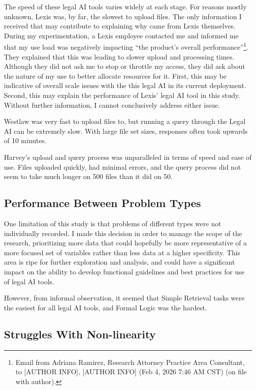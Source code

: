 \documentclass[
]{article}
\begin{document}
The speed of these legal AI tools varies widely at each stage. For reasons mostly unknown, Lexis was, by far, the slowest to upload files. The only information I received that may contribute to explaining why came from Lexis themselves. During my experimentation, a Lexis employee contacted me and informed me that my use load was negatively impacting ``the product's overall performance''\footnote{Email from Adriana Ramirez, Research Attorney Practice Area Consultant, to {[}AUTHOR INFO{]}, {[}AUTHOR INFO{]} (Feb 4, 2026 7:46 AM CST) (on file with author).}. They explained that this was leading to slower upload and processing times. Although they did not ask me to stop or throttle my access, they did ask about the nature of my use to better allocate resources for it. First, this may be indicative of overall scale issues with the this legal AI in its current deployment. Second, this may explain the performance of Lexis' legal AI tool in this study. Without further information, I cannot conclusively address either issue.

Westlaw was very fast to upload files to, but running a query through the Legal AI can be extremely slow. With large file set sizes, responses often took upwards of 10 minutes.

Harvey's upload and query process was unparalleled in terms of speed and ease of use. Files uploaded quickly, had minimal errors, and the query process did not seem to take much longer on 500 files than it did on 50.

\subsection{Performance Between Problem Types}\label{performance-between-problem-types}

One limitation of this study is that problems of different types were not individually recorded. I made this decision in order to manage the scope of the research, prioritizing more data that could hopefully be more representative of a more focused set of variables rather than less data at a higher specificity. This area is ripe for further exploration and analysis, and could have a significant impact on the ability to develop functional guidelines and best practices for use of legal AI tools.

However, from informal observation, it seemed that Simple Retrieval tasks were the easiest for all legal AI tools, and Formal Logic was the hardest.

\subsection{Struggles With Non-linearity}\label{struggles-with-non-linearity}
\end{document}

